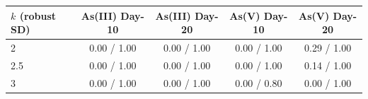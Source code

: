\begin{tabular}{lcccc}
  \toprule
  $k$ (robust SD) & As(III) Day-10 & As(III) Day-20 & As(V) Day-10 & As(V) Day-20 \\
  \midrule
  2 & 0.00 / 1.00 & 0.00 / 1.00 & 0.00 / 1.00 & 0.29 / 1.00 \\
  2.5 & 0.00 / 1.00 & 0.00 / 1.00 & 0.00 / 1.00 & 0.14 / 1.00 \\
  3 & 0.00 / 1.00 & 0.00 / 1.00 & 0.00 / 0.80 & 0.00 / 1.00 \\
  \bottomrule
\end{tabular}
